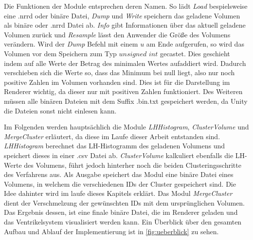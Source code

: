 Die Funktionen der Module entsprechen deren Namen. So lädt \textit{Load} bespielsweise eine .nrrd oder binäre Datei, \textit{Dump} und \textit{Write} speichern das geladene Volumen als binäre oder .nrrd Datei ab. \textit{Info} gibt Informationen über das aktuell geladene Volumen zurück und \textit{Resample} lässt den Anwender die Größe des Volumens verändern.
\newline
Wird der \textit{Dump} Befehl mit einem $u$ am Ende aufgerufen, so wird das Volumen vor dem Speichern zum Typ $unsigned$ $int$ gecastet. Dies geschieht indem auf alle Werte der Betrag des minimalen Wertes aufaddiert wird. Dadurch verschieben sich die Werte so, dass das Minimum bei null liegt, also nur noch positive Zahlen im Volumen vorhanden sind. Dies ist für die Darstellung im Renderer wichtig, da dieser nur mit positiven Zahlen funktioniert. Des Weiteren müssen alle binären Dateien mit dem Suffix .bin.txt gespeichert werden, da Unity die Dateien sonst nicht einlesen kann.


Im Folgenden werden hauptsächlich die Module \textit{LHHistogram}, \textit{ClusterVolume} und \textit{MergeCluster} erläutert, da diese im Laufe dieser Arbeit entstanden sind. \textit{LHHistogram} berechnet das LH-Histogramm des geladenen Volumens und speichert dieses in einer .csv Datei ab.
\newline
\textit{ClusterVolume} kalkuliert ebenfalls die LH-Werte des Volumens, führt jedoch hinterher noch die beiden Clusteringsschritte des Verfahrens aus. Als Ausgabe speichert das Modul eine binäre Datei eines Volumens, in welchem die verschiedenen IDs der Cluster gespeichert sind. Die Idee dahinter wird im laufe dieses Kapitels erklärt.
Das Modul \textit{MergeCluster} dient der Verschmelzung der gewünschten IDs mit dem ursprünglichen Volumen. Das Ergebnis dessen, ist eine finale binäre Datei, die im Renderer geladen und das Ventrikelsystem visualisiert werden kann. Ein Überblick über den gesamten Aufbau und Ablauf der Implementierung ist in  \autoref{fig:ueberblick} zu sehen.

